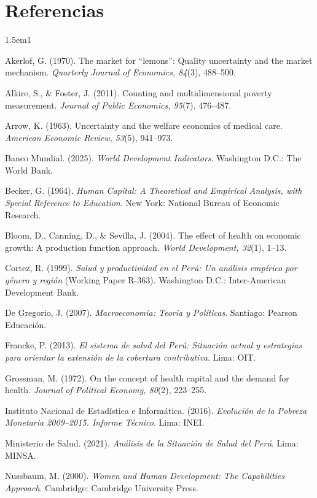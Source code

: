 \documentclass[12pt]{article}
\begin{document}
\section*{Referencias}

\begin{hangparas}{1.5em}{1}

Akerlof, G. (1970). The market for ``lemons'': Quality uncertainty and the market mechanism.
\textit{Quarterly Journal of Economics, 84}(3), 488--500.

Alkire, S., \& Foster, J. (2011). Counting and multidimensional poverty measurement.
\textit{Journal of Public Economics, 95}(7), 476--487.

Arrow, K. (1963). Uncertainty and the welfare economics of medical care.
\textit{American Economic Review, 53}(5), 941--973.

Banco Mundial. (2025). \textit{World Development Indicators}. Washington D.C.: The World Bank.

Becker, G. (1964). \textit{Human Capital: A Theoretical and Empirical Analysis, with Special
Reference to Education}. New York: National Bureau of Economic Research.

Bloom, D., Canning, D., \& Sevilla, J. (2004). The effect of health on economic growth:
A production function approach. \textit{World Development, 32}(1), 1--13.

Cortez, R. (1999). \textit{Salud y productividad en el Perú: Un análisis empírico por género y
región} (Working Paper R-363). Washington D.C.: Inter-American Development Bank.

De Gregorio, J. (2007). \textit{Macroeconomía: Teoría y Políticas}. Santiago: Pearson
Educación.

Francke, P. (2013). \textit{El sistema de salud del Perú: Situación actual y estrategias para
orientar la extensión de la cobertura contributiva}. Lima: OIT.

Grossman, M. (1972). On the concept of health capital and the demand for health.
\textit{Journal of Political Economy, 80}(2), 223--255.

Instituto Nacional de Estadística e Informática. (2016). \textit{Evolución de la Pobreza
Monetaria 2009--2015. Informe Técnico}. Lima: INEI.

Ministerio de Salud. (2021). \textit{Análisis de la Situación de Salud del Perú}. Lima: MINSA.

Nussbaum, M. (2000). \textit{Women and Human Development: The Capabilities Approach}.
Cambridge: Cambridge University Press.


\end{hangparas}
\end{document}
